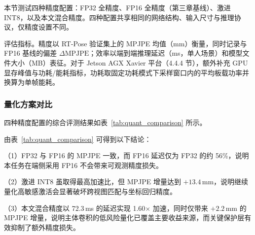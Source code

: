 本节测试四种精度配置：FP32 全精度、FP16 全精度（第三章基线）、激进 INT8，以及本文混合精度。四种配置共享相同的网络结构、输入尺寸与推理协议，仅精度设置不同。

评估指标。精度以 RT-Pose 验证集上的 MPJPE 均值（mm）衡量，同时记录与 FP16 基线的偏差 $\Delta\text{MPJPE}$；效率以端到端推理延迟（ms，单人场景）和模型文件大小（MB）表征。对于 Jetson AGX Xavier 平台（4.4.4 节），额外补充 GPU 显存峰值与功耗/能耗指标，功耗取固定功耗模式下采样窗口内的平均板载功率并换算为单帧能耗。

\subsubsection{量化方案对比}

四种精度配置的综合评测结果如表~\ref{tab:quant_comparison} 所示。

\begin{table}[htbp]
  \centering
  \small
\caption{不同精度配置的精度与效率对比}
  \label{tab:quant_comparison}
\end{table}

由表~\ref{tab:quant_comparison} 可得到以下结论：

（1）FP32 与 FP16 的 MPJPE 一致，而 FP16 延迟仅为 FP32 的约 56\%，说明本任务在端侧采用 FP16 不会带来可观测精度损失。

（2）激进 INT8 虽取得最高加速比，但 MPJPE 增量达到 $+13.4\,\text{mm}$，说明继续量化高敏感激活会显著破坏跨视图匹配与坐标回归精度。

（3）本文混合精度以 72.3\,ms 的延迟实现 1.60$\times$ 加速，同时仅带来 $+2.2\,\text{mm}$ 的 MPJPE 增量，说明主体卷积的低风险量化已覆盖主要收益来源，而关键保护层有效抑制了额外精度损失。

